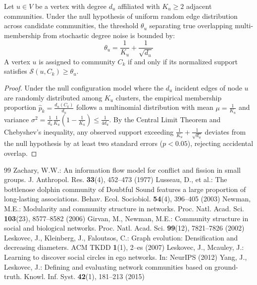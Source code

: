 \documentclass{llncs}
\begin{document}
\begin{theorem}\label{thm:overlap_bound}
Let $u \in V$ be a vertex with degree $d_u$ affiliated with $K_u \ge 2$ adjacent communities. Under the null hypothesis of uniform random edge distribution across candidate communities, the threshold $\theta_u$ separating true overlapping multi-membership from stochastic degree noise is bounded by:
\begin{equation}
\theta_u = \frac{1}{K_u} + \frac{1}{\sqrt{d_u}}
\end{equation}
A vertex $u$ is assigned to community $C_k$ if and only if its normalized support satisfies $\mathcal{S}(u, C_k) \ge \theta_u$.
\end{theorem}
\begin{proof}
Under the null configuration model where the $d_u$ incident edges of node $u$ are randomly distributed among $K_u$ clusters, the empirical membership proportion $\hat{p}_k = \frac{d_u(C_k)}{d_u}$ follows a multinomial distribution with mean $\mu = \frac{1}{K_u}$ and variance $\sigma^2 = \frac{1}{d_u} \frac{1}{K_u}\left(1 - \frac{1}{K_u}\right) \le \frac{1}{4 d_u}$. By the Central Limit Theorem and Chebyshev's inequality, any observed support exceeding $\frac{1}{K_u} + \frac{1}{\sqrt{d_u}}$ deviates from the null hypothesis by at least two standard errors ($p < 0.05$), rejecting accidental overlap.
\end{proof}

\begin{thebibliography}{99}
 Zachary, W.W.: An information flow model for conflict and fission in small groups. J. Anthropol. Res. \textbf{33}(4), 452--473 (1977)
 Lusseau, D., et al.: The bottlenose dolphin community of Doubtful Sound features a large proportion of long-lasting associations. Behav. Ecol. Sociobiol. \textbf{54}(4), 396--405 (2003)
 Newman, M.E.: Modularity and community structure in networks. Proc. Natl. Acad. Sci. \textbf{103}(23), 8577--8582 (2006)
 Girvan, M., Newman, M.E.: Community structure in social and biological networks. Proc. Natl. Acad. Sci. \textbf{99}(12), 7821--7826 (2002)
 Leskovec, J., Kleinberg, J., Faloutsos, C.: Graph evolution: Densification and decreasing diameters. ACM TKDD \textbf{1}(1), 2--es (2007)
 Leskovec, J., Mcauley, J.: Learning to discover social circles in ego networks. In: NeurIPS (2012)
 Yang, J., Leskovec, J.: Defining and evaluating network communities based on ground-truth. Knowl. Inf. Syst. \textbf{42}(1), 181--213 (2015)
\end{thebibliography}
\end{document}
